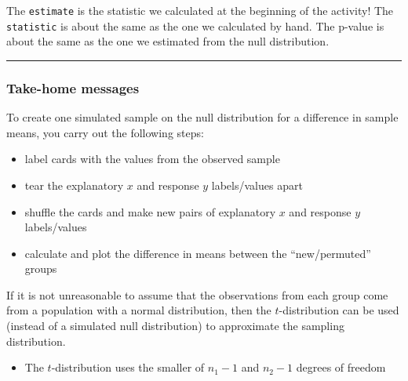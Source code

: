 \documentclass[
  letterpaper,
  DIV=11,
  numbers=noendperiod]{scrartcl}
\providecommand{\tightlist}{%
  \setlength{\itemsep}{0pt}\setlength{\parskip}{0pt}}\usepackage{longtable,booktabs,array}
\begin{document}
The \texttt{estimate} is the statistic we calculated at the beginning of
the activity! The \texttt{statistic} is about the same as the one we
calculated by hand. The p-value is about the same as the one we
estimated from the null distribution.

\begin{center}\rule{0.5\linewidth}{0.5pt}\end{center}

\hypertarget{take-home-messages}{%
\subsubsection{Take-home messages}\label{take-home-messages}}

To create one simulated sample on the null distribution for a difference
in sample means, you carry out the following steps:

\begin{itemize}
\tightlist
\item
  label cards with the values from the observed sample
\item
  tear the explanatory \(x\) and response \(y\) labels/values apart
\item
  shuffle the cards and make new pairs of explanatory \(x\) and response
  \(y\) labels/values
\item
  calculate and plot the difference in means between the
  ``new/permuted'' groups
\end{itemize}

If it is not unreasonable to assume that the observations from each
group come from a population with a normal distribution, then the
\(t\)-distribution can be used (instead of a simulated null
distribution) to approximate the sampling distribution.

\begin{itemize}
\tightlist
\item
  The \(t\)-distribution uses the smaller of \(n_1 - 1\) and \(n_2 - 1\)
  degrees of freedom
\end{itemize}
\end{document}

